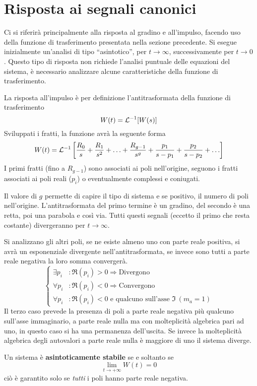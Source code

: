 
\section{Risposta ai segnali canonici}
Ci si riferirà principalmente alla risposta al gradino e all'impulso, facendo
uso della funzione di trasferimento presentata nella sezione precedente.
Si esegue inizialmente un'analisi di tipo ``asintotico'', per $t\to \infty$,
successivamente per $t\to 0$. Questo tipo di risposta non richiede l'analisi
puntuale delle equazioni del sistema, è necessario analizzare alcune
caratteristiche della funzione di trasferimento.

La risposta all'impulso è per definizione l'antitrasformata della funzione di
trasferimento
$$
W(t) = \mathcal{L}^{-1} [W(s)]
$$
Sviluppati i fratti, la funzione avrà la seguente forma
$$
W(t) = \mathcal{L}^{-1}\left[\frac{R_0}{s} + \frac{R_1}{s^2} +\ldots +
\frac{R_{g-1}}{s^g} + \frac{p_1}{s-p_1} + \frac{p_2}{s-p_2} + \ldots \right]
$$
I primi fratti (fino a $R_{g-1}$) sono associati ai poli nell'origine, seguono
i fratti associati ai poli reali ($p_i$) o eventualmente complessi e coniugati.

Il valore di $g$ permette di capire il tipo di sistema e se positivo, il numero
di poli nell'origine.
L'antitrasformata del primo termine è un gradino, del secondo è una retta, poi
una parabola e così via.
Tutti questi segnali (eccetto il primo che resta costante) divergeranno per
$t\to \infty$.

Si analizzano gli altri poli, se ne esiste almeno uno con parte reale positiva,
si avrà un esponenziale divergente nell'antitrasformata, se invece sono tutti a
parte reale negativa la loro somma convergerà.
$$\left\{
\begin{aligned}
\exists p_i &: \Re(p_i) > 0 \Rightarrow \text{Divergono} \\
\forall p_i &: \Re(p_i) < 0 \Rightarrow \text{Convergono} \\
\forall p_i &: \Re(p_i) < 0 \text{ e qualcuno sull'asse } \Im\ (m_a=1)
\end{aligned}\right.
$$
Il terzo caso prevede la presenza di poli a parte reale negativa più
qualcuno sull'asse immaginario, a parte reale
nulla ma con molteplicità algebrica pari ad uno, in questo caso si ha una
permanenza dell'uscita. Se invece la molteplicità algebrica degli autovalori a
parte reale nulla è maggiore di uno il sistema diverge.

Un sistema è \textbf{asintoticamente stabile} se e soltanto se
$$
\lim_{t\to +\infty} W(t) = 0
$$
ciò è garantito solo se \textit{tutti} i poli hanno parte reale negativa.

